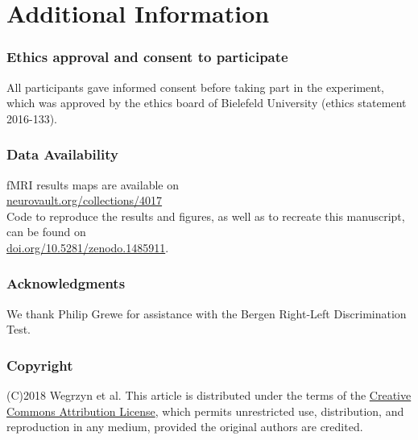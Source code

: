 \documentclass[fleqn,10pt]{SelfArx} %
\begin{document}

\section*{Additional Information}

\subsubsection*{Ethics approval and consent to participate}
\small{All participants gave informed consent before taking part in the experiment, which was approved by the ethics board of Bielefeld University (ethics statement 2016-133).}

\subsubsection*{Data Availability}
\small{
	fMRI results maps are available on \\
	\href{https://neurovault.org/collections/4017/}{neurovault.org/collections/4017}  \\
	Code to reproduce the results and figures, as well as to recreate this manuscript, can be found on  \\
	\href{https://doi.org/10.5281/zenodo.1485911}{doi.org/10.5281/zenodo.1485911}.}

\subsubsection*{Acknowledgments}
\small{We thank Philip Grewe for assistance with the Bergen Right-Left Discrimination Test.}

\subsubsection*{Copyright}
\small{
	(C)2018 Wegrzyn et al. This article is distributed under the terms of the \href{http://creativecommons.org/licenses/by/4.0/}{Creative Commons Attribution License}, which permits unrestricted use, distribution, and reproduction in any medium, provided the original authors are credited.}



\renewcommand*{\bibfont}{\footnotesize}



\end{document}
